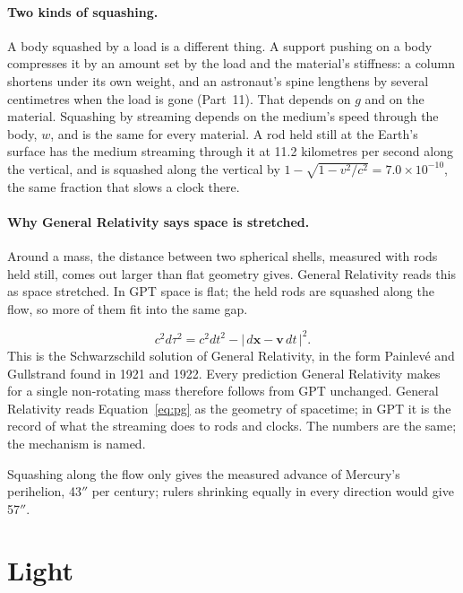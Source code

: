 \documentclass[11pt,a4paper]{article}
\begin{document}
\paragraph{Two kinds of squashing.} A body squashed by a load is a different thing. A support pushing on a body compresses it by an amount set by the load and the material's stiffness: a column shortens under its own weight, and an astronaut's spine lengthens by several centimetres when the load is gone (Part~11). That depends on $g$ and on the material. Squashing by streaming depends on the medium's speed through the body, $w$, and is the same for every material. A rod held still at the Earth's surface has the medium streaming through it at 11.2 kilometres per second along the vertical, and is squashed along the vertical by $1-\sqrt{1-v^2/c^2} = 7.0\times10^{-10}$, the same fraction that slows a clock there.

\paragraph{Why General Relativity says space is stretched.} Around a mass, the distance between two spherical shells, measured with rods held still, comes out larger than flat geometry gives. General Relativity reads this as space stretched. In GPT space is flat; the held rods are squashed along the flow, so more of them fit into the same gap.

\begin{equation}
c^2 d\tau^2 = c^2 dt^2 - \left|\,d\mathbf{x} - \mathbf{v}\,dt\,\right|^2 .
\label{eq:pg}
\end{equation}
This is the Schwarzschild solution of General Relativity, in the form Painlevé and Gullstrand found in 1921 and 1922. Every prediction General Relativity makes for a single non-rotating mass therefore follows from GPT unchanged. General Relativity reads Equation~\eqref{eq:pg} as the geometry of spacetime; in GPT it is the record of what the streaming does to rods and clocks. The numbers are the same; the mechanism is named.

Squashing along the flow only gives the measured advance of Mercury's perihelion, 43$''$ per century; rulers shrinking equally in every direction would give 57$''$.

\section{Light}
\label{sec:light}
\end{document}
